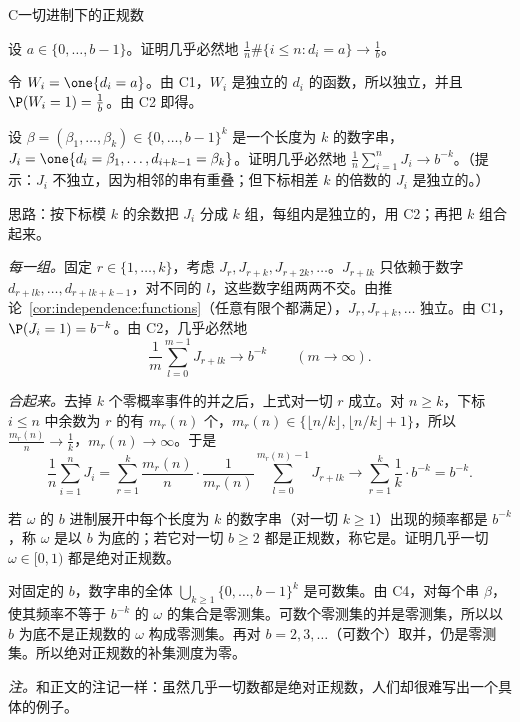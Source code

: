 \begin{probleme}{C}{一切进制下的正规数}
\begin{questions}
\item 设 $a\in\{0,\dots,b-1\}$。证明几乎必然地 $\frac1n\#\{i\leqslant n:d_i=a\}\to\frac1b$。
\begin{solution}
令 $W_i=\one\{d_i=a\}$。由 C1，$W_i$ 是独立的 $d_i$ 的函数，所以独立，并且 $\P(W_i=1)=\frac1b$。由 C2 即得。
\end{solution}

\item 设 $\beta=(\beta_1,\dots,\beta_k)\in\{0,\dots,b-1\}^k$ 是一个长度为 $k$ 的数字串，$J_i=\one\{d_i=\beta_1,\dots,d_{i+k-1}=\beta_k\}$。证明几乎必然地 $\frac1n\sum_{i=1}^nJ_i\to b^{-k}$。（提示：$J_i$ 不独立，因为相邻的串有重叠；但下标相差 $k$ 的倍数的 $J_i$ 是独立的。）
\begin{solution}
思路：按下标模 $k$ 的余数把 $J_i$ 分成 $k$ 组，每组内是独立的，用 C2；再把 $k$ 组合起来。

\emph{每一组。}固定 $r\in\{1,\dots,k\}$，考虑 $J_r,J_{r+k},J_{r+2k},\dots$。$J_{r+lk}$ 只依赖于数字 $d_{r+lk},\dots,d_{r+lk+k-1}$，对不同的 $l$，这些数字组两两不交。由推论~\ref{cor:independence:functions}（任意有限个都满足），$J_r,J_{r+k},\dots$ 独立。由 C1，$\P(J_i=1)=b^{-k}$。由 C2，几乎必然地
\[
\frac1m\sum_{l=0}^{m-1}J_{r+lk}\to b^{-k}\qquad(m\to\infty).
\]

\emph{合起来。}去掉 $k$ 个零概率事件的并之后，上式对一切 $r$ 成立。对 $n\geqslant k$，下标 $i\leqslant n$ 中余数为 $r$ 的有 $m_r(n)$ 个，$m_r(n)\in\{\lfloor n/k\rfloor,\lfloor n/k\rfloor+1\}$，所以 $\frac{m_r(n)}n\to\frac1k$，$m_r(n)\to\infty$。于是
\[
\frac1n\sum_{i=1}^nJ_i=\sum_{r=1}^k\frac{m_r(n)}n\cdot\frac1{m_r(n)}\sum_{l=0}^{m_r(n)-1}J_{r+lk}\to\sum_{r=1}^k\frac1k\cdot b^{-k}=b^{-k}.
\]
\end{solution}

\item 若 $\omega$ 的 $b$ 进制展开中每个长度为 $k$ 的数字串（对一切 $k\geqslant1$）出现的频率都是 $b^{-k}$，称 $\omega$ 是以 $b$ 为底的；若它对一切 $b\geqslant2$ 都是正规数，称它是。证明几乎一切 $\omega\in[0,1)$ 都是绝对正规数。
\begin{solution}
对固定的 $b$，数字串的全体 $\bigcup_{k\geqslant1}\{0,\dots,b-1\}^k$ 是可数集。由 C4，对每个串 $\beta$，使其频率不等于 $b^{-k}$ 的 $\omega$ 的集合是零测集。可数个零测集的并是零测集，所以以 $b$ 为底不是正规数的 $\omega$ 构成零测集。再对 $b=2,3,\dots$（可数个）取并，仍是零测集。所以绝对正规数的补集测度为零。

\emph{注。}和正文的注记一样：虽然几乎一切数都是绝对正规数，人们却很难写出一个具体的例子。
\end{solution}
\end{questions}
\end{probleme}

